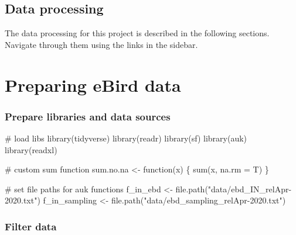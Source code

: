 \documentclass[]{article}
\newenvironment{Shaded}{}{}
\newcommand{\CommentTok}[1]{\textcolor[rgb]{0.00,0.50,0.00}{#1}}
\newcommand{\ControlFlowTok}[1]{\textcolor[rgb]{0.00,0.00,1.00}{#1}}
\newcommand{\DataTypeTok}[1]{#1}
\newcommand{\KeywordTok}[1]{\textcolor[rgb]{0.00,0.00,1.00}{#1}}
\newcommand{\NormalTok}[1]{#1}
\newcommand{\OperatorTok}[1]{#1}
\newcommand{\StringTok}[1]{\textcolor[rgb]{0.00,0.50,0.50}{#1}}
\begin{document}
\hypertarget{data-processing}{%
\subsection{Data processing}\label{data-processing}}

The data processing for this project is described in the following sections. Navigate through them using the links in the sidebar.

\hypertarget{preparing-ebird-data}{%
\section{Preparing eBird data}\label{preparing-ebird-data}}

\hypertarget{prepare-libraries-and-data-sources}{%
\subsubsection{Prepare libraries and data sources}\label{prepare-libraries-and-data-sources}}

\begin{Shaded}
\begin{Highlighting}[]

\CommentTok{# load libs}
\KeywordTok{library}\NormalTok{(tidyverse)}
\KeywordTok{library}\NormalTok{(readr)}
\KeywordTok{library}\NormalTok{(sf)}
\KeywordTok{library}\NormalTok{(auk)}
\KeywordTok{library}\NormalTok{(readxl)}

\CommentTok{# custom sum function}
\NormalTok{sum.no.na <-}\StringTok{ }\ControlFlowTok{function}\NormalTok{(x) \{}
  \KeywordTok{sum}\NormalTok{(x, }\DataTypeTok{na.rm =}\NormalTok{ T)}
\NormalTok{\}}

\CommentTok{# set file paths for auk functions}
\NormalTok{f_in_ebd <-}\StringTok{ }\KeywordTok{file.path}\NormalTok{(}\StringTok{"data/ebd_IN_relApr-2020.txt"}\NormalTok{)}
\NormalTok{f_in_sampling <-}\StringTok{ }\KeywordTok{file.path}\NormalTok{(}\StringTok{"data/ebd_sampling_relApr-2020.txt"}\NormalTok{)}
\end{Highlighting}
\end{Shaded}

\hypertarget{filter-data}{%
\subsubsection{Filter data}\label{filter-data}}

\begin{Shaded}
\end{Shaded}
\end{document}
